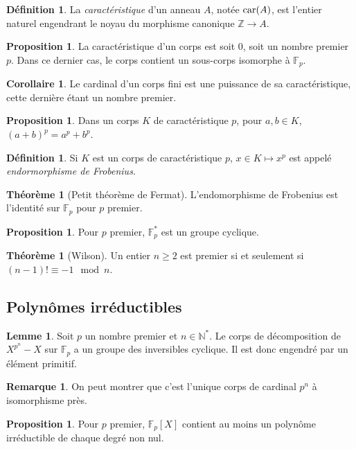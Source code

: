 \documentclass[a5paper, 10pt]{article}
\theoremstyle{definition}
\newtheorem{definition}[equation]{Définition}
\newtheorem{proposition}[equation]{Proposition}
\newtheorem{theorem}[equation]{Théorème}
\newtheorem{lemma}[equation]{Lemme}
\newtheorem{remark}[equation]{Remarque}
\newtheorem{corollary}[equation]{Corollaire}
\newcounter{n}
\def\F{\mathbb{F}}
\def\Z{\mathbb{Z}}
\def\N{\mathbb{N}}
\def\car{\textnormal{car}}
\begin{document}
\begin{definition}
  La \emph{caractéristique} d'un anneau $A$, notée $\car(A)$, est
  l'entier naturel engendrant le noyau du morphisme canonique
  $\Z \to A$.
\end{definition}
\begin{proposition}
  La caractéristique d'un corps est soit 0, soit un nombre premier
  $p$. Dans ce dernier cas, le corps contient un sous-corps isomorphe
  à $\F_p$.
\end{proposition}
\begin{corollary}
  Le cardinal d'un corps fini est une puissance de sa caractéristique,
  cette dernière étant un nombre premier.
\end{corollary}
\begin{proposition}
  Dans un corps $K$ de caractéristique $p$, pour $a, b \in K$,
  ${(a+b)}^p = a^p + b^p$.
\end{proposition}
\begin{definition}
  Si $K$ est un corps de caractéristique $p$, $x \in K \mapsto x^p$
  est appelé \emph{endormorphisme de Frobenius}.
\end{definition}
\begin{theorem}[Petit théorème de Fermat]
  L'endomorphisme de Frobenius est l'identité sur $\F_p$ pour $p$
  premier.
\end{theorem}
\begin{proposition}
  Pour $p$ premier, $\F_p^*$ est un groupe cyclique.
\end{proposition}
\begin{theorem}[Wilson]
  Un entier $n \geq 2$ est premier si et seulement si
  $(n-1)! \equiv -1 \mod n$.
\end{theorem}

\subsection{Polynômes irréductibles}

\begin{lemma}
  Soit $p$ un nombre premier et $n \in \N^*$. Le corps de
  décomposition de $X^{p^n} - X$ sur $\F_p$ a un groupe des
  inversibles cyclique. Il est donc engendré par un élément primitif.
\end{lemma}
\begin{remark}
  On peut montrer que c'est l'unique corps de cardinal $p^n$ à
  isomorphisme près.
\end{remark}
\begin{proposition}
  Pour $p$ premier, $\F_p[X]$ contient au moins un polynôme
  irréductible de chaque degré non nul.
\end{proposition}
\end{document}
